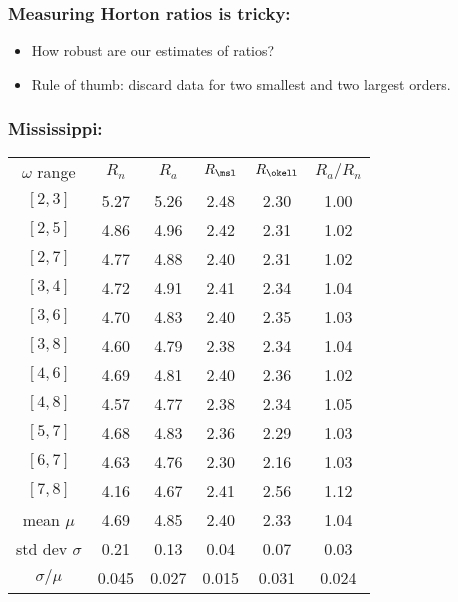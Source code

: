 \begin{frame}[label=]
  \frametitle{Measuring Horton ratios is tricky:}
  
  \begin{itemize}
  \item<1-> How robust are our estimates of ratios?
  \item<2-> Rule of thumb: discard data for two smallest
    and two largest orders.
  \end{itemize}

\end{frame}

\begin{frame}[label=]
  \frametitle{Mississippi:}

  \begin{tabular}{cccccc}
    $\omega$ range & $R_n$ & $R_a$ & $R_\msl$ & $R_{\okell}$ & $R_a/R_n$ \\
    $[2,3]$ & 5.27 & 5.26 & 2.48 & 2.30 & 1.00 \\
    $[2,5]$ & 4.86 & 4.96 & 2.42 & 2.31 & 1.02 \\
    $[2,7]$ & 4.77 & 4.88 & 2.40 & 2.31 & 1.02 \\
    $[3,4]$ & 4.72 & 4.91 & 2.41 & 2.34 & 1.04 \\
    $[3,6]$ & 4.70 & 4.83 & 2.40 & 2.35 & 1.03 \\
    $[3,8]$ & 4.60 & 4.79 & 2.38 & 2.34 & 1.04 \\
    $[4,6]$ & 4.69 & 4.81 & 2.40 & 2.36 & 1.02 \\
    $[4,8]$ & 4.57 & 4.77 & 2.38 & 2.34 & 1.05 \\
    $[5,7]$ & 4.68 & 4.83 & 2.36 & 2.29 & 1.03 \\
    $[6,7]$ & 4.63 & 4.76 & 2.30 & 2.16 & 1.03 \\
    $[7,8]$ & 4.16 & 4.67 & 2.41 & 2.56 & 1.12 \\
    mean $\mu$ & 4.69 & 4.85 & 2.40 & 2.33 & 1.04 \\
    std dev $\sigma$ & 0.21 &  0.13 & 0.04 & 0.07 & 0.03 \\
    $\sigma/\mu$ & 0.045 &  0.027 & 0.015 & 0.031 & 0.024 \\
  \end{tabular}
\end{frame}

